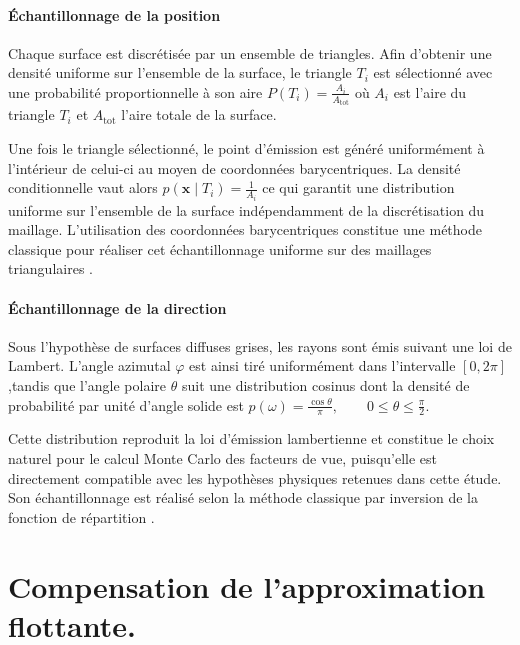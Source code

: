 \paragraph{Échantillonnage de la position}

Chaque surface est discrétisée par un ensemble de triangles. Afin d'obtenir une densité uniforme sur l'ensemble de la surface, le triangle $T_i$ est sélectionné avec une probabilité proportionnelle à son aire $P(T_i)=\frac{A_i}{A_{\mathrm{tot}}}$ où $A_i$ est l'aire du triangle $T_i$ et $A_{\mathrm{tot}}$ l'aire totale de la surface.

Une fois le triangle sélectionné, le point d'émission est généré uniformément à l'intérieur de celui-ci au moyen de coordonnées barycentriques. La densité conditionnelle vaut alors $p(\mathbf{x}\mid T_i)=\frac{1}{A_i}$ ce qui garantit une distribution uniforme sur l'ensemble de la surface indépendamment de la discrétisation du maillage. L'utilisation des coordonnées barycentriques constitue une méthode classique pour réaliser cet échantillonnage uniforme sur des maillages triangulaires \cite{Pharr2018}.

\paragraph{Échantillonnage de la direction}

Sous l'hypothèse de surfaces diffuses grises, les rayons sont émis suivant une loi de Lambert. L'angle azimutal $\varphi$ est ainsi tiré uniformément dans l'intervalle $[0,2\pi]$,tandis que l'angle polaire $\theta$ suit une distribution cosinus dont la densité de probabilité par unité d'angle solide est $
p(\omega)=\frac{\cos\theta}{\pi},
\qquad
0 \leq \theta \leq \frac{\pi}{2}$.

Cette distribution reproduit la loi d'émission lambertienne et constitue le choix naturel pour le calcul Monte Carlo des facteurs de vue, puisqu'elle est directement compatible avec les hypothèses physiques retenues dans cette étude. Son échantillonnage est réalisé selon la méthode classique par inversion de la fonction de répartition \cite{Pharr2018}.



\section{Compensation de l'approximation flottante.}
